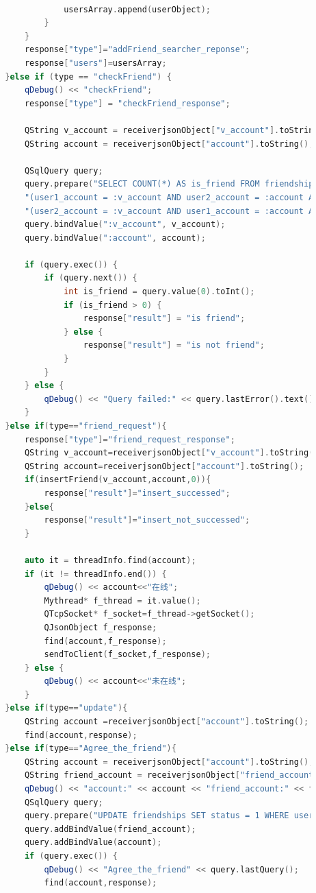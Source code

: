 \documentclass[UTF8]{ctexart}
\begin{document}
\begin{lstlisting}[language=C++, caption=服务端接受信息并处理]
					
					usersArray.append(userObject);
				}
			}
			response["type"]="addFriend_searcher_reponse";
			response["users"]=usersArray;
		}else if (type == "checkFriend") {
			qDebug() << "checkFriend";
			response["type"] = "checkFriend_response";
			
			QString v_account = receiverjsonObject["v_account"].toString();
			QString account = receiverjsonObject["account"].toString();
			
			QSqlQuery query;
			query.prepare("SELECT COUNT(*) AS is_friend FROM friendships WHERE "
			"(user1_account = :v_account AND user2_account = :account AND status = 1) OR "
			"(user2_account = :v_account AND user1_account = :account AND status = 1);");
			query.bindValue(":v_account", v_account);
			query.bindValue(":account", account);
			
			if (query.exec()) {
				if (query.next()) {
					int is_friend = query.value(0).toInt();
					if (is_friend > 0) {
						response["result"] = "is friend";
					} else {
						response["result"] = "is not friend";
					}
				}
			} else {
				qDebug() << "Query failed:" << query.lastError().text();
			}
		}else if(type=="friend_request"){
			response["type"]="friend_request_response";
			QString v_account=receiverjsonObject["v_account"].toString();
			QString account=receiverjsonObject["account"].toString();
			if(insertFriend(v_account,account,0)){
				response["result"]="insert_successed";
			}else{
				response["result"]="insert_not_successed";
			}
			
			auto it = threadInfo.find(account);
			if (it != threadInfo.end()) {
				qDebug() << account<<"在线";
				Mythread* f_thread = it.value();
				QTcpSocket* f_socket=f_thread->getSocket();
				QJsonObject f_response;
				find(account,f_response);
				sendToClient(f_socket,f_response);
			} else {
				qDebug() << account<<"未在线";
			}
		}else if(type=="update"){
			QString account =receiverjsonObject["account"].toString();
			find(account,response);
		}else if(type=="Agree_the_friend"){
			QString account = receiverjsonObject["account"].toString();
			QString friend_account = receiverjsonObject["friend_account"].toString();
			qDebug() << "account:" << account << "friend_account:" << friend_account;
			QSqlQuery query;
			query.prepare("UPDATE friendships SET status = 1 WHERE user1_account = ? AND user2_account = ?;");
			query.addBindValue(friend_account);
			query.addBindValue(account);
			if (query.exec()) {
				qDebug() << "Agree_the_friend" << query.lastQuery();
				find(account,response);
				

\end{lstlisting}
\end{document}
